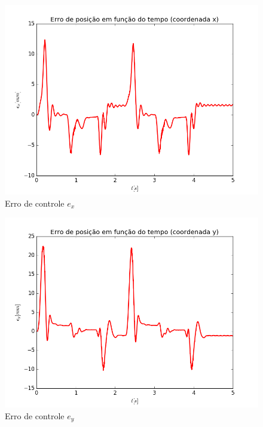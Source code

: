 \documentclass[]{politex}
\begin{document}
\begin{multicols}{2}
\begin{figure}[H]
	\centering
	\includegraphics[scale=0.39]{../../../Experimental/Aquisicoes/PIDt_triangulo/ex.png}  
	\caption{Erro de controle $e_x$}
	\label{fig:PIDq_triangulo_ex}
\end{figure}
\begin{figure}[H]
	\centering
	\includegraphics[scale=0.39]{../../../Experimental/Aquisicoes/PIDt_triangulo/ey.png}  
	\caption{Erro de controle $e_y$}
	\label{fig:PIDq_triangulo_ey}
\end{figure}
\end{multicols}
\end{document}
